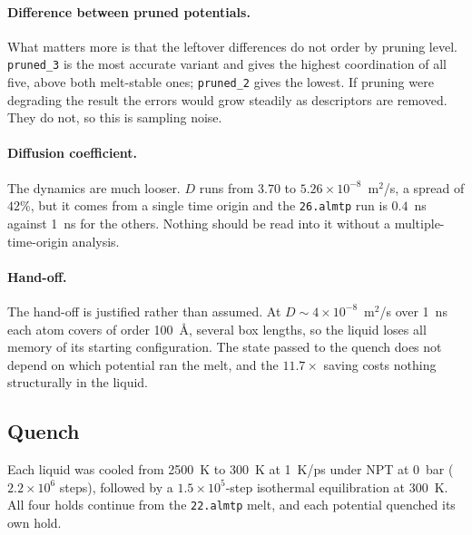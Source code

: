 \documentclass{article}
\begin{document}
\paragraph{Difference between pruned potentials.}
What matters more is that the leftover differences do not order by pruning level. \texttt{pruned\_3} is the most accurate variant and gives the highest coordination of all five, above both melt-stable ones; \texttt{pruned\_2} gives the lowest. If pruning were degrading the result the errors would grow steadily as descriptors are removed. They do not, so this is sampling noise.

\paragraph{Diffusion coefficient.}
The dynamics are much looser. $D$ runs from 3.70 to $5.26\times10^{-8}$~m$^2$/s, a spread of $42\%$, but it comes from a single time origin and the \texttt{26.almtp} run is $0.4$~ns against 1~ns for the others. Nothing should be read into it without a multiple-time-origin analysis.

\paragraph{Hand-off.}
The hand-off is justified rather than assumed. At $D \sim 4\times10^{-8}$~m$^2$/s over 1~ns each atom covers of order 100~\AA, several box lengths, so the liquid loses all memory of its starting configuration. The state passed to the quench does not depend on which potential ran the melt, and the $11.7\times$ saving costs nothing structurally in the liquid.

\subsection{Quench}

Each liquid was cooled from 2500~K to 300~K at 1~K/ps under NPT at 0~bar ($2.2\times10^{6}$ steps), followed by a $1.5\times10^{5}$-step isothermal equilibration at 300~K. All four holds continue from the \texttt{22.almtp} melt, and each potential quenched its own hold.
\end{document}
